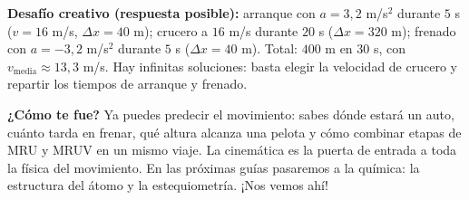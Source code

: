 \documentclass[12pt, letterpaper]{article}
\begin{document}
  \textbf{Desafío creativo (respuesta posible):} arranque con $a = 3{,}2$ m/s$^2$ durante $5$ s ($v = 16$ m/s, $\Delta x = 40$ m); crucero a $16$ m/s durante $20$ s ($\Delta x = 320$ m); frenado con $a = -3{,}2$ m/s$^2$ durante $5$ s ($\Delta x = 40$ m). Total: $400$ m en $30$ s, con $v_{\text{media}} \approx 13{,}3$ m/s. Hay infinitas soluciones: basta elegir la velocidad de crucero y repartir los tiempos de arranque y frenado.

  \vspace{8pt}
  \begin{cuadroinfo}
    \small
    \textbf{¿Cómo te fue?} Ya puedes predecir el movimiento: sabes dónde estará un auto, cuánto tarda en frenar, qué altura alcanza una pelota y cómo combinar etapas de MRU y MRUV en un mismo viaje. La cinemática es la puerta de entrada a toda la física del movimiento. En las próximas guías pasaremos a la química: la estructura del átomo y la estequiometría. ¡Nos vemos ahí!
  \end{cuadroinfo}

\fi
\end{document}
